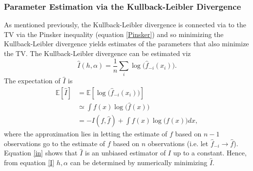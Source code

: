 \subsubsection{Parameter Estimation via the Kullback-Leibler Divergence}
As mentioned previously, the Kullback-Leibler divergence is connected via to the TV via the Pinsker inequality (equation \eqref{Pinsker}) and so minimizing the Kullback-Leibler divergence yields estimates of the parameters that also minimize the TV. The Kullback-Leibler divergence can be estimated viz
\begin{equation}
	\hat{I}(h,\alpha)=\frac{1}{n}\sum_{i}\log\big(\hat{f}_{-i}(x_i)\big).
	\label{I}
\end{equation}
The expectation of $\hat{I}$ is
\begin{equation}
	\begin{split}
		\mathbb{E}[\hat{I}]&=\mathbb{E}[\log\big(\hat{f}_{-i}(x_i)\big)]\\
		&\simeq\int f(x)\log\big(\hat{f}(x)\big)\\
		&=-I(f,\hat{f})+\int f(x)\log\big(f(x)\big)dx,
	\end{split}
	\label{in}
\end{equation}
where the approximation lies in letting the estimate of $f$ based on $n-1$ observations go to the estimate of $f$ based on $n$ observations (i.e. let $\hat{f}_{-i}\rightarrow \hat{f}$). Equation \eqref{in} shows that $\hat{I}$ is an unbiased estimator of $I$ up to a constant. Hence, from equation \eqref{I} $h,\alpha$ can be determined by numerically minimizing $\hat{I}$.

